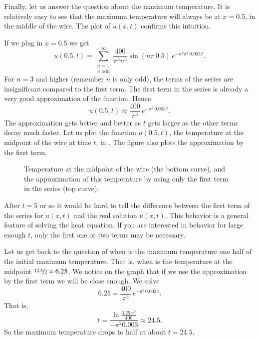 \documentclass[12pt]{book}
\begin{document}
\begin{example}
Finally, let us answer the question about the maximum temperature.  It is
relatively easy to see
that the maximum temperature will always be at $x=0.5$, in
the middle of the wire.  The plot of $u(x,t)$ confirms this intuition.

If we plug in $x=0.5$ we get
\begin{equation*}
u(0.5,t) = 
\sum_{\substack{n=1 \\ n \text{ odd}}}^\infty
\frac{400}{\pi^3 n^3}
\sin (n \pi\, 0.5 )
\, e^{-n^2 \pi^2 \, 0.003 \, t} .
\end{equation*}
For $n=3$ and higher (remember $n$ is only odd), the terms
of the series
are insignificant compared to the first term.
The first term in the series is already a very good approximation
of the function.  
Hence 
\begin{equation*}
u(0.5,t) \approx
\frac{400}{\pi^3}
\, e^{-\pi^2 \, 0.003 \, t} .
\end{equation*}
The approximation gets better and better as $t$ gets larger as the other
terms decay much faster.
Let us plot the function $u(0.5,t)$, the temperature at the midpoint of the wire
at time $t$, in .  The figure also
plots the approximation by the first term.

\begin{figure}[h!t]
\capstart
\begin{center}
\caption{Temperature at the midpoint of the wire (the bottom curve),
and the approximation of this temperature by using only the first term in
the series (top curve).\label{heat:wireexmaxfig}}
\end{center}
\end{figure}

After $t=5$ or so
it would be hard to tell the difference
between the first term of the series for $u(x,t)$ and 
the real solution $u(x,t)$.  This behavior
is a general feature of solving the heat equation.
If you are interested in behavior for large enough $t$, only the
first one or two terms may be necessary.

Let us
get back to the question of when is the maximum temperature one half of the
initial maximum temperature.  That is, when is the temperature
at the midpoint $\nicefrac{12.5}{2} = 6.25$.  We notice on the graph that if we use
the approximation by the first term we will be close enough.  We
solve
\begin{equation*}
6.25 =
\frac{400}{\pi^3}
\, e^{-\pi^2 \, 0.003 \, t} .
\end{equation*}
That is,
\begin{equation*}
t =
\frac{\ln \frac{6.25\,\pi^3}{400}}{-\pi^2 0.003}
\approx 24.5 .
\end{equation*}
So the maximum temperature drops to half at about $t=24.5$.
\end{example}
\end{document}
